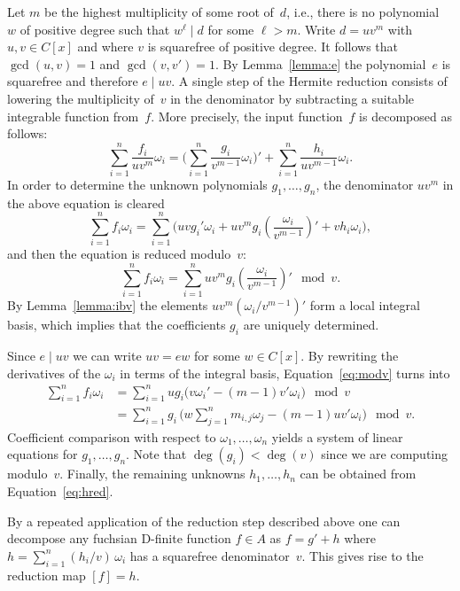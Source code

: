 \documentclass{sig-alternate}
\begin{document}
Let $m$ be the highest multiplicity of some root of~$d$, i.e., there is no
polynomial~$w$ of positive degree such that $w^\ell\mid d$ for some $\ell>m$.
Write $d=uv^m$ with $u,v\in C[x]$ and where $v$ is squarefree of positive
degree.  It follows that $\gcd(u,v)=1$ and $\gcd(v,v')=1$. By
Lemma~\ref{lemma:e} the polynomial~$e$ is squarefree and therefore $e\mid uv$.
A single step of the Hermite reduction consists of lowering the multiplicity
of~$v$ in the denominator by subtracting a suitable integrable function
from~$f$. More precisely, the input function~$f$ is decomposed as follows:
\begin{equation}\label{eq:hred}
  \sum_{i=1}^n \frac{f_i}{uv^m}\omega_i =
  \biggl(\sum_{i=1}^n\frac{g_i}{v^{m-1}}\omega_i\biggr)' +
  \sum_{i=1}^n \frac{h_i}{uv^{m-1}}\omega_i.
\end{equation}
In order to determine the unknown polynomials $g_1,\ldots,g_n$, the
denominator $uv^m$ in the above equation is cleared
\[
  \sum_{i=1}^n f_i\omega_i = \sum_{i=1}^n \biggl( uvg_i'\omega_i +
  uv^mg_i\left(\frac{\omega_i}{v^{m-1}}\right)' + vh_i\omega_i \biggr),
\]
and then the equation is reduced modulo~$v$:
\begin{equation}\label{eq:modv}
  \sum_{i=1}^n f_i\omega_i =
  \sum_{i=1}^n uv^mg_i\left(\frac{\omega_i}{v^{m-1}}\right)' \mod v.
\end{equation}
By Lemma~\ref{lemma:ibv} the elements $uv^m(\omega_i/v^{m-1})'$ form a local
integral basis, which implies that the coefficients $g_i$ are uniquely
determined.

Since $e\mid uv$ we can write $uv=ew$ for some $w\in C[x]$. By rewriting the
derivatives of the $\omega_i$ in terms of the integral basis,
Equation~\eqref{eq:modv} turns into
\begin{align*}
  \sum_{i=1}^n f_i\omega_i 
  &= \sum_{i=1}^n ug_i \bigl( v\omega_i' - (m-1)v'\omega_i \bigr) \mod v\\
  &= \sum_{i=1}^n g_i\, \biggl( w\sum_{j=1}^n m_{i,j}\omega_j - (m-1)uv'\omega_i \biggr) \mod v.
\end{align*}
Coefficient comparison with respect to $\omega_1,\ldots,\omega_n$ yields a
system of linear equations for $g_1,\ldots,g_n$. Note that $\deg(g_i)<\deg(v)$
since we are computing modulo~$v$. Finally, the remaining unknowns
$h_1,\ldots,h_n$ can be obtained from Equation~\eqref{eq:hred}.

By a repeated application of the reduction step described above
one can decompose any fuchsian D-finite function $f\in A$ as
$f=g'+h$ where $h=\sum_{i=1}^n (h_i/v)\,\omega_i$ has a squarefree
denominator~$v$. This gives rise to the reduction map $[f]=h$.
\end{document}
